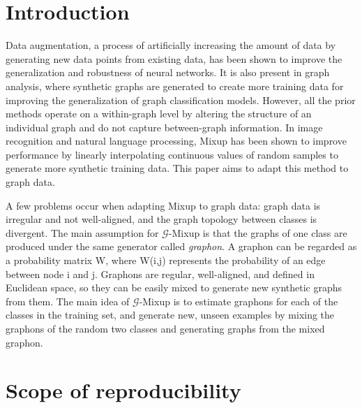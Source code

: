 \section{Introduction}
Data augmentation, a process of artificially increasing the amount of data by generating new data points from existing data, has been shown to improve the generalization and robustness of neural networks. It is also present in graph analysis, where synthetic graphs are generated to create more training data for improving the generalization of graph classification models. However, all the prior methods operate on a within-graph level by altering the structure of an individual graph and do not capture between-graph information. In image recognition and natural language processing, Mixup has been shown to improve performance by linearly interpolating continuous values of random samples to generate more synthetic training data. This paper aims to adapt this method to graph data.

A few problems occur when adapting Mixup to graph data: graph data is irregular and not well-aligned, and the graph topology between classes is divergent. The main assumption for $\mathcal{G}$-Mixup is that the graphs of one class are produced under the same generator called \textit{graphon}. A graphon \cite{airoldi2013stochastic} can be regarded as a probability matrix W, where W(i,j) represents the probability of an edge between node i and j. Graphons are regular, well-aligned, and defined in Euclidean space, so they can be easily mixed to generate new synthetic graphs from them. The main idea of $\mathcal{G}$-Mixup is to estimate graphons for each of the classes in the training set, and generate new, unseen examples by mixing the graphons of the random two classes and generating graphs from the mixed graphon.

\section{Scope of reproducibility}
\label{sec:claims}

